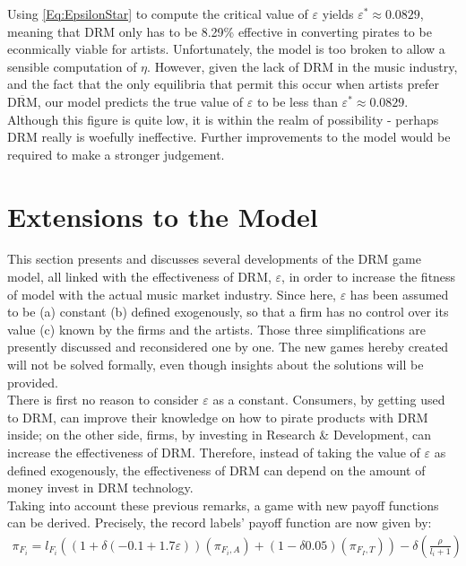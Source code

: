 \documentclass[letter,12pt]{article}
\numberwithin{equation}{section}
\newcommand{\drm}{\text{DRM}}
\newcommand{\nodrm}{\overline{\drm}}
\begin{document}
Using \eqref{Eq:EpsilonStar} to compute the critical value of $\varepsilon$ yields $\varepsilon^* \approx 0.0829$, meaning that DRM only has to be 8.29\% effective in converting pirates to be econmically viable for artists. Unfortunately, the model is too broken to allow a sensible computation of $\eta$. However, given the lack of DRM in the music industry, and the fact that the only equilibria that permit this occur when artists prefer $\nodrm$, our model predicts the true value of $\varepsilon$ to be less than $\varepsilon^* \approx 0.0829$. Although this figure is quite low, it is within the realm of possibility - perhaps DRM really is woefully ineffective. Further improvements to the model would be required to make a stronger judgement.

\section{Extensions to the Model} \label{Sec:Extensions}

This section presents and discusses several developments of the DRM
game model, all linked with the effectiveness of DRM, $\varepsilon$,
in order to increase the fitness of model with the actual music market
industry. Since here, $\varepsilon$ has been assumed to be (a) constant
(b) defined exogenously, so that a firm has no control over its value
(c) known by the firms and the artists. Those three simplifications
are presently discussed and reconsidered one by one. The new games
hereby created will not be solved formally, even though insights about
the solutions will be provided.\\

There is first no reason to consider $\varepsilon$ as a constant.
Consumers, by getting used to DRM, can improve their knowledge on
how to pirate products with DRM inside; on the other side, firms,
by investing in Research \& Development, can increase the effectiveness
of DRM. Therefore, instead of taking the value of $\varepsilon$ as
defined exogenously, the effectiveness of DRM can depend on the amount
of money invest in DRM technology.\\

Taking into account these previous remarks, a game with new payoff
functions can be derived. Precisely, the record labels’ payoff function
are now given by:
\begin{eqnarray*}
\pi_{F_{i}}=l_{F_{i}}((1+\delta(-0.1+1.7\varepsilon))(\pi_{F_{i},A})+(1-\delta0.05)(\pi_{F_{I},T}))-\delta(\frac{\rho}{l_{i}+1})
\end{eqnarray*}
\end{document}
